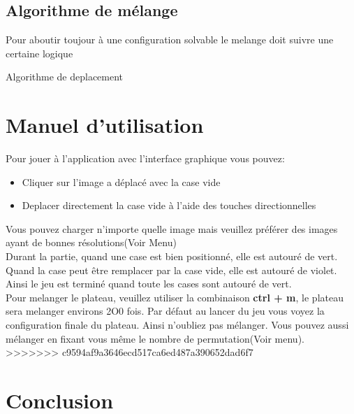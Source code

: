 \documentclass[12pt]{article}
\begin{document}
\subsection{Algorithme de mélange}
Pour aboutir toujour à une configuration solvable le melange doit suivre une certaine logique
\begin{algorithm}[h!]

	\DontPrintSemicolon


	\Return{$\ListeCases$}
	\caption{Algorithme de deplacement}
\end{algorithm}

\section{Manuel d'utilisation}
Pour jouer à l'application avec l'interface graphique vous pouvez:
\begin{itemize}
	\item Cliquer sur l'image a déplacé avec la case vide 
	\item Deplacer directement la case vide à l'aide des touches directionnelles
\end{itemize}
Vous pouvez charger n'importe quelle image mais veuillez préférer des images ayant de bonnes
résolutions(Voir Menu) \\

Durant la partie, quand une case est bien positionné, elle est autouré de vert. Quand la case
peut être remplacer par la case vide, elle est autouré de violet. Ainsi le jeu est terminé quand toute les cases
sont autouré de vert.\\

Pour melanger le plateau, veuillez utiliser la combinaison \textbf{ctrl + m}, le plateau sera
melanger environs 2O0 fois. Par défaut au lancer du jeu vous voyez la configuration finale du plateau.
Ainsi n'oubliez pas mélanger. Vous pouvez aussi mélanger en fixant vous même le nombre de permutation(Voir menu).
>>>>>>> c9594af9a3646ecd517ca6ed487a390652dad6f7

\section{Conclusion}
\end{document}
